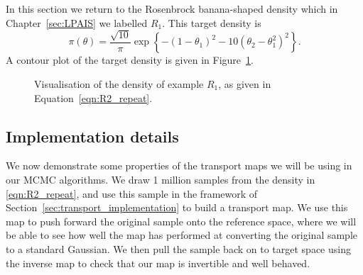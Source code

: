 \documentclass[final]{siamltex}
\begin{document}
In this section we return to the Rosenbrock banana-shaped density which in Chapter~\ref{sec:LPAIS} we labelled $R_1$. This target density is
\begin{equation}\label{eqn:R2_repeat}
	\pi(\theta) = \frac{\sqrt{10}}{\pi}\exp\left\{ -(1 - \theta_1)^2 - 10(\theta_2 - \theta_1^2)^2 \right\}.
\end{equation}
A contour plot of the target density is given in Figure~\ref{fig:R2_posterior}.
\begin{figure}
\centering
{}
\caption{Visualisation of the density of example $R_1$, as given in Equation~\eqref{eqn:R2_repeat}.}
\label{fig:R2_posterior}
\end{figure}

\subsection{Implementation details}

We now demonstrate some properties of the transport maps we will be using in our MCMC algorithms. We draw 1 million samples from the density in \eqref{eqn:R2_repeat}, and use this sample in the framework of Section~\ref{sec:transport_implementation} to build a transport map. We use this map to push forward the original sample onto the reference space, where we will be able to see how well the map has performed at converting the original sample to a standard Gaussian. We then pull the sample back on to target space using the inverse map to check that our map is invertible and well behaved.
\end{document}
